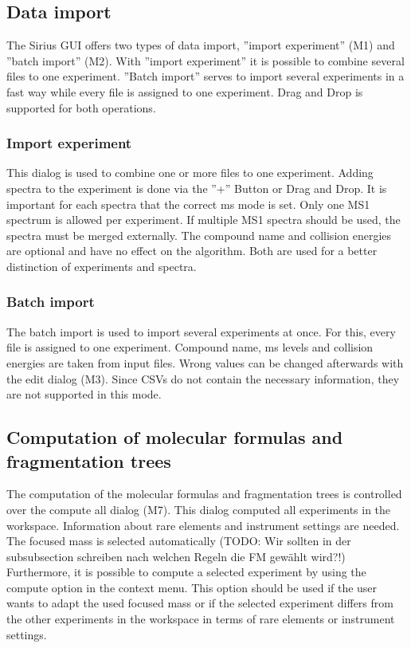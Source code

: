 \documentclass[a4paper,11pt]{article}
\begin{document}
 \subsection{Data import}
 
 The Sirius GUI offers two types of data import, ''import experiment'' (M1) and ''batch import'' (M2). 
 With ''import experiment'' it is possible to combine  several files to one experiment. 
 ''Batch import'' serves to import several experiments in a fast way while every file is assigned to one experiment. 
 Drag and Drop is supported for both operations.
 
 \subsubsection{Import experiment}
 \label{sec:import-experiment}
 
 This dialog is used to combine one or more files to one experiment. Adding spectra to the experiment is done via 
 the ''+'' Button or Drag and Drop. It is important for each spectra that the correct ms mode is set.  
 Only one MS1 spectrum is allowed per experiment. If multiple MS1 spectra should be used, the spectra must be merged externally.  
 The compound name and collision energies are optional and have no effect on the algorithm. 
 Both are used for a better distinction of experiments and spectra. 
 
 \subsubsection{Batch import}
 \label{sec:import-batch}
 
 The batch import is used to import several experiments at once. For this, every file is assigned to one experiment. 
 Compound name, ms levels and collision energies are taken from input files. Wrong values can be changed afterwards with the edit dialog (M3).  
 Since CSVs do not contain the necessary information, they are not supported in this mode.
 
 \subsection{Computation of molecular formulas and fragmentation trees}
 \label{sec:compute-all}
 
 The computation of the molecular formulas and fragmentation trees is controlled over the compute all dialog (M7).
 This dialog computed all experiments in the workspace. Information about rare elements and instrument settings are needed.
 The focused mass is selected automatically (TODO: Wir sollten in der subsubsection schreiben nach welchen Regeln die FM gewählt wird?!)
 Furthermore, it is possible to compute a selected experiment by using the compute option in the context menu.
 This option should be used if the user wants to adapt the used focused mass or if the selected experiment differs from the other experiments in
 the workspace in terms of rare elements or instrument settings.
 
\end{document}

